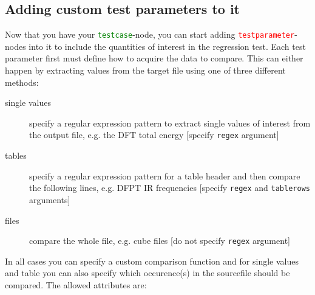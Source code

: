\documentclass[a4paper,12pt]{scrartcl}
\newcommand{\testcase}{\textcolor{green}{\texttt{testcase}}}
\newcommand{\testparameter}{\textcolor{red}{\texttt{testparameter}}}
\begin{document}
\subsection{Adding custom test parameters to it}
Now that you have your \testcase{}-node, you can start adding \testparameter{}-nodes into it to include the
quantities of interest in the regression test. Each test parameter first must define how to acquire the data to
compare. This can either happen by extracting values from the target file using one of three different methods:
\begin{description}
    \item[single values] specify a regular expression pattern to extract single values of interest from the output
        file, e.g. the DFT total energy [specify \texttt{regex} argument]
    \item[tables] specify a regular expression pattern for a table header and then compare the following lines, e.g.
        DFPT IR frequencies [specify \texttt{regex} and \texttt{tablerows} arguments]
    \item[files] compare the whole file, e.g. cube files [do not specify \texttt{regex} argument]
\end{description}
In all cases you can specify a custom comparison function and for single values and table you can also specify which
occurence(s) in the sourcefile should be compared. The allowed attributes are:
\end{document}
